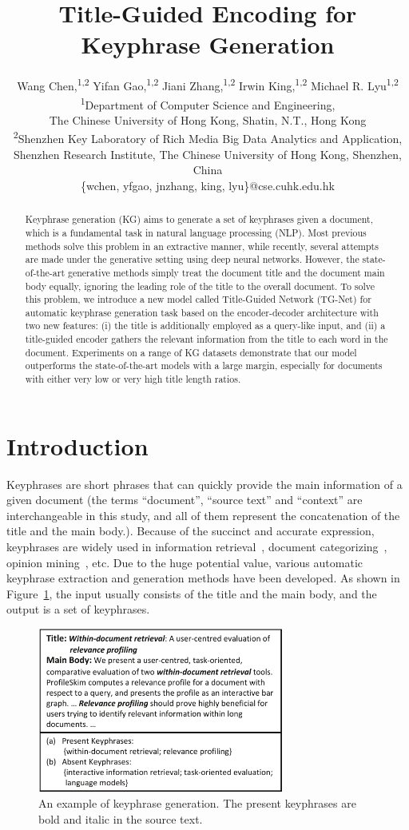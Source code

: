 \documentclass[letterpaper]{article} %
\title{Title-Guided Encoding for Keyphrase Generation}
\author{Wang Chen,\textsuperscript{1,2} Yifan Gao,\textsuperscript{1,2} Jiani Zhang,\textsuperscript{1,2} Irwin King,\textsuperscript{1,2} Michael R. Lyu\textsuperscript{1,2} \\
\textsuperscript{1}Department of Computer Science and Engineering, \\
The Chinese University of Hong Kong, Shatin, N.T., Hong Kong \\
\textsuperscript{2}Shenzhen Key Laboratory of Rich Media Big Data Analytics and Application, \\
Shenzhen Research Institute, The Chinese University of Hong Kong, Shenzhen, China \\
\{wchen, yfgao, jnzhang, king, lyu\}@cse.cuhk.edu.hk \\
}
\begin{document}
\maketitle

\begin{abstract}
Keyphrase generation (KG) aims to generate a set of keyphrases given a document, which is a fundamental task in natural language processing (NLP). Most previous methods solve this problem in an extractive manner, while recently, several attempts are made under the generative setting using deep neural networks. However, the state-of-the-art generative methods simply treat the document title and the document main body equally, ignoring the leading role of the title to the overall document. To solve this problem, we introduce a new model called Title-Guided Network (TG-Net) for automatic keyphrase generation task based on the encoder-decoder architecture with two new features: (\textrm{i}) the title is additionally employed as a query-like input, and (\textrm{ii}) a title-guided encoder gathers the relevant information from the title to each word in the document. Experiments on a range of KG datasets demonstrate that our model outperforms the state-of-the-art models with a large margin, especially for documents with either very low or very high title length ratios.
\end{abstract}


\section{Introduction}
Keyphrases are short phrases that can quickly provide the main information of a given document (the terms ``document'', ``source text'' and ``context'' are interchangeable in this study, and all of them represent the concatenation of the title and the main body.). Because of the succinct and accurate expression, keyphrases are widely used in information retrieval~\cite{jones1999phrasier}, document categorizing~\cite{hulth2006study}, opinion mining~\cite{berend2011opinion}, etc. Due to the huge potential value, various automatic keyphrase extraction and generation methods have been developed. As shown in Figure~\ref{figure: keyphrase generation example}, the input usually consists of the title and the main body, and the output is a set of keyphrases.

\begin{figure}
\centering
\includegraphics[width=3.2in]{figures/PaperID3210_TGNet_intro_case_study_cmyk.pdf}
\caption{An example of keyphrase generation. The present keyphrases are bold and italic in the source text.}
\label{figure: keyphrase generation example}
\end{figure}
\end{document}

